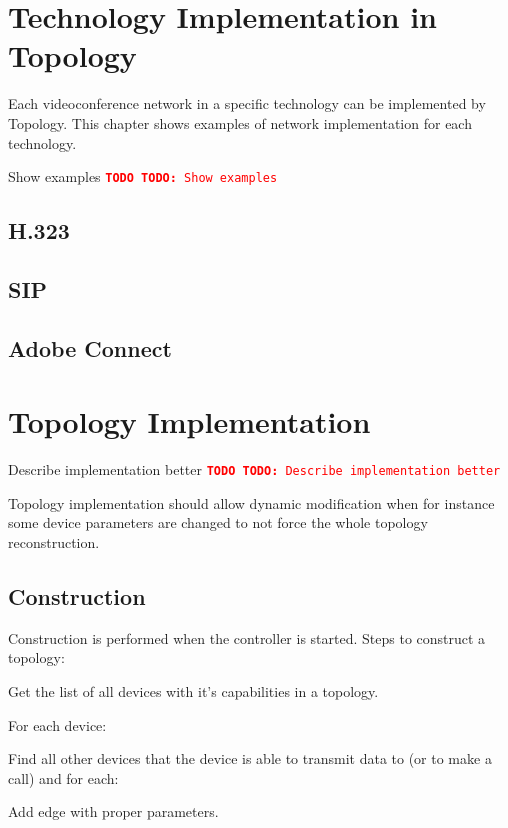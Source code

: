 \documentclass[a4paper]{report}
\newcommand{\TODO}[1]{%
\def\empty{}%
\def\prvniparametr{#1}%
\ifx\prvniparametr\empty%
\begingroup\tt\textcolor{red}{\noindent\textbf{TODO}}\endgroup
\else%
\begingroup\tt\textcolor{red}{\noindent\textbf{TODO:}\ #1}\endgroup
\fi%
}
\begin{document}
\chapter{Technology Implementation in Topology}
Each videoconference network in a specific technology can be implemented by Topology. This chapter shows examples of network implementation for each technology.

\TODO{Show examples}

\section{H.323}

\section{SIP}

\section{Adobe Connect}


\chapter{Topology Implementation}

\TODO{Describe implementation better}

Topology implementation should allow dynamic modification when for instance some device parameters are changed to not force the whole topology reconstruction.      
      
\section{Construction}

Construction is performed when the controller is started. Steps to construct a topology:

\begin{enumerate}

\item Get the list of all devices with it's capabilities in a topology.

\item For each device: 
  \begin{compactitem}
  \item Find all other devices that the device is able to transmit
  data to (or to make a call) and for each:
    \begin{compactitem}
    \item Add edge with proper parameters.
    \end{compactitem}
  \end{compactitem}

\end{enumerate}     
     
\end{document}
